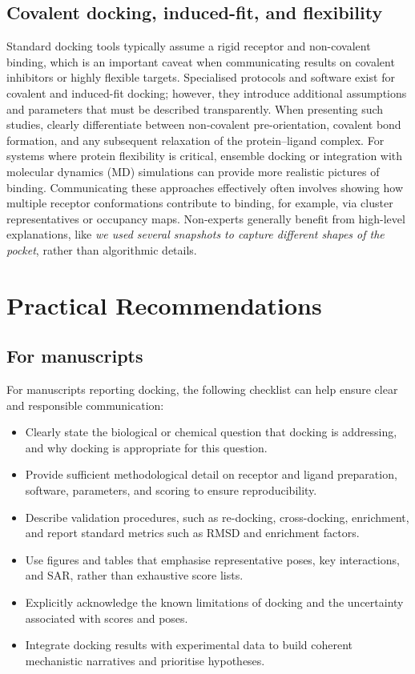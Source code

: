\documentclass[12pt]{article}
\begin{document}
\subsection{Covalent docking, induced-fit, and flexibility}

Standard docking tools typically assume a rigid receptor and non-covalent binding, which is an important caveat when communicating results on covalent inhibitors or highly flexible targets. Specialised protocols and software exist for covalent and induced-fit docking; however, they introduce additional assumptions and parameters that must be described transparently\cite{CH11_AutoDock4,CH11_Glide2004,CH11_zhu2022}. When presenting such studies, clearly differentiate between non-covalent pre-orientation, covalent bond formation, and any subsequent relaxation of the protein--ligand complex\cite{CH11_AutoDock4,CH11_Kitchen2004}.  For systems where protein flexibility is critical, ensemble docking or integration with molecular dynamics (MD) simulations can provide more realistic pictures of binding. Communicating these approaches effectively often involves showing how multiple receptor conformations contribute to binding, for example, via cluster representatives or occupancy maps. Non-experts generally benefit from high-level explanations, like \emph{we used several snapshots to capture different shapes of the pocket}, rather than algorithmic details.

\section{Practical Recommendations}

\subsection{For manuscripts}

For manuscripts reporting docking, the following checklist can help ensure clear and responsible communication:

\begin{itemize}
  \item Clearly state the biological or chemical question that docking is addressing, and why docking is appropriate for this question.
  \item Provide sufficient methodological detail on receptor and ligand preparation, software, parameters, and scoring to ensure reproducibility.
  \item Describe validation procedures, such as re-docking, cross-docking, enrichment, and report standard metrics such as RMSD and enrichment factors.
  \item Use figures and tables that emphasise representative poses, key interactions, and SAR, rather than exhaustive score lists.
  \item Explicitly acknowledge the known limitations of docking and the uncertainty associated with scores and poses.
  \item Integrate docking results with experimental data to build coherent mechanistic narratives and prioritise hypotheses.
\end{itemize}
\end{document}
